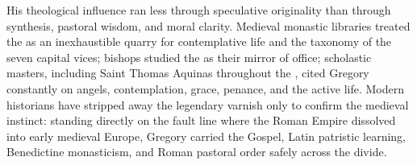 His theological influence ran less through speculative originality than
through synthesis, pastoral wisdom, and moral clarity. Medieval monastic
libraries treated the  as an inexhaustible quarry for
contemplative life and the taxonomy of the seven capital vices; bishops studied
the  as their mirror of office; scholastic masters,
including Saint Thomas Aquinas throughout the , cited
Gregory constantly on angels, contemplation, grace, penance, and the active
life. Modern historians have stripped away the legendary varnish only to
confirm the medieval instinct: standing directly on the fault line where the
Roman Empire dissolved into early medieval Europe, Gregory carried the Gospel,
Latin patristic learning, Benedictine monasticism, and Roman pastoral order
safely across the divide.
